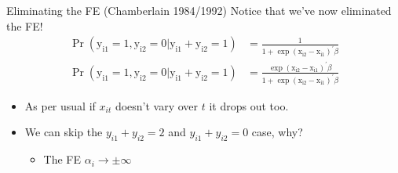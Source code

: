 \documentclass[xcolor=pdftex,dvipsnames,table,mathserif,aspectratio=169]{beamer}
\begin{document}
\begin{frame}{Eliminating the FE (Chamberlain 1984/1992)}
Notice that we've now eliminated the FE!
\begin{align*}
\operatorname{Pr}\left(\mathrm{y}_{\mathrm{i} 1}=1, \mathrm{y}_{\mathrm{i} 2}=0 | \mathrm{y}_{\mathrm{i} 1}+\mathrm{y}_{\mathrm{i} 2}=1\right)&=
\frac{1}{1+\exp \left(\mathrm{x}_{\mathrm{i} 2}-\mathrm{x}_{\mathrm{i} 1}\right)^{\prime} \beta}\\
\operatorname{Pr}\left(\mathrm{y}_{\mathrm{i} 1}=1, \mathrm{y}_{\mathrm{i} 2}=0 | \mathrm{y}_{\mathrm{i} 1}+\mathrm{y}_{\mathrm{i} 2}=1\right)&=
\frac{\exp \left(\mathrm{x}_{\mathrm{i} 2}-\mathrm{x}_{\mathrm{i} 1}\right)^{\prime} \beta}{1+\exp \left(\mathrm{x}_{\mathrm{i} 2}-\mathrm{x}_{\mathrm{i} 1}\right)^{\prime} \beta}
\end{align*}
\begin{itemize}
\item As per usual if $x_{it}$ doesn't vary over $t$ it drops out too.
\item We can skip the $y_{i1} + y_{i2}=2$ and $y_{i1} + y_{i2}=0$ case, why?
\begin{itemize}
\item The FE $\alpha_i \rightarrow \pm \infty$
\end{itemize}
\end{itemize}
\end{frame}
\end{document}
